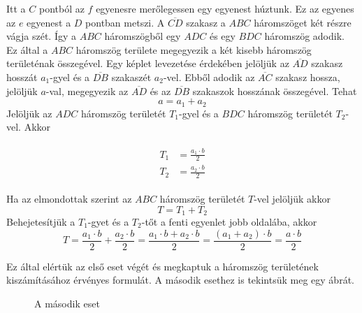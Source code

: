 \documentclass[11pt, a4paper]{article}
\begin{document}
Itt a $C$ pontb\'ol az $f$ egyenesre mer\H{o}legessen egy egyenest h\'uztunk. Ez az egyenes az $e$ egyenest a $D$ pontban metszi. A $\overline{CD}$ szakasz a $ABC$ h\'aromszöget k\'et r\'eszre v\'agja sz\'et. \'Igy a $ABC$ h\'aromszögb\H{o}l egy $ADC$ \'es egy $BDC$ h\'aromszög adodik. Ez \'altal a $ABC$ h\'aromszög területe megegyezik a k\'et kisebb h\'aromszög terület\'enak összeg\'evel. Egy k\'eplet levezet\'ese \'erdek\'eben jelöljük az $\overline{AD}$ szakasz hossz\'at $a_1$-gyel \'es a $\overline{DB}$ szakasz\'et $a_2$-vel. Ebb\H{o}l adodik az $\overline{AC}$ szakasz hossza, jelöljük $a$-val, megegyezik az $\overline{AD}$ \'es az $\overline{DB}$ szakaszok hossz\'anak összeg\'evel. Tehat
\[
a = a_1 + a_2
\]
Jelöljük az $ADC$ h\'aromszög terület\'et $T_1$-gyel \'es a $BDC$ h\'aromszög terület\'et $T_2$-vel. Akkor

\begin{align}
 \begin{aligned}
     T_1 &= \frac{a_1\cdot b}{2} \\
     T_2 &= \frac{a_2\cdot b}{2}
 \end{aligned}
 \end{align}

 Ha az elmondottak szerint az $ABC$ h\'aromszög terület\'et $T$-vel jelöljük akkor
 \[
  T = T_1 + T_2
 \]
Behejetes\'itjük a $T_1$-gyet \'es a $T_2$-t\H{o}t a fenti egyenlet jobb oldal\'aba, akkor
 \[
     T = \frac{a_1\cdot b}{2} + \frac{a_2\cdot b}{2} = \frac{a_1\cdot b + a_2\cdot b}{2} = \frac{(a_1 + a_2) \cdot b}{2} = \frac{a\cdot b}{2}
 \]

Ez \'altal el\'ertük az els\H{o} eset v\'eg\'et \'es megkaptuk a h\'aromszög terület\'enek kisz\'am\'it\'as\'ahoz \'erv\'enyes formul\'at.
\newpage
A m\'asodik esethez is tekintsük meg egy \'abr\'at.

\begin{figure}[h]
\centering
{}
    \caption{A m\'asodik eset}
\label{fig:tri1}
\end{figure}
\end{document}
